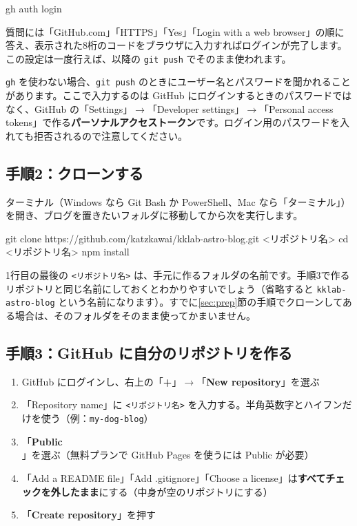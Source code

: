 \documentclass[a4paper,11pt]{ltjsarticle}
\newcommand{\file}[1]{\texttt{#1}}
\begin{document}
\begin{code}
gh auth login
\end{code}

質問には「GitHub.com」「HTTPS」「Yes」「Login with a web browser」の順に答え、表示された8桁のコードをブラウザに入力すればログインが完了します。この設定は一度行えば、以降の \file{git push} でそのまま使われます。

\begin{hint}[パスワードを聞かれたら]
\file{gh} を使わない場合、\file{git push} のときにユーザー名とパスワードを聞かれることがあります。ここで入力するのは GitHub にログインするときのパスワードではなく、GitHub の「Settings」$\to$「Developer settings」$\to$「Personal access tokens」で作る\textbf{パーソナルアクセストークン}です。ログイン用のパスワードを入れても拒否されるので注意してください。
\end{hint}

\subsection{手順2：クローンする}

ターミナル（Windows なら Git Bash か PowerShell、Mac なら「ターミナル」）を開き、ブログを置きたいフォルダに移動してから次を実行します。

\begin{code}
git clone https://github.com/katzkawai/kklab-astro-blog.git <リポジトリ名>
cd <リポジトリ名>
npm install
\end{code}

1行目の最後の \file{<リポジトリ名>} は、手元に作るフォルダの名前です。手順3で作るリポジトリと同じ名前にしておくとわかりやすいでしょう（省略すると \file{kklab-astro-blog} という名前になります）。すでに\ref{sec:prep}節の手順でクローンしてある場合は、そのフォルダをそのまま使ってかまいません。

\subsection{手順3：GitHub に自分のリポジトリを作る}

\begin{enumerate}
  \item GitHub にログインし、右上の「\textbf{+}」$\to$「\textbf{New repository}」を選ぶ
  \item 「Repository name」に \file{<リポジトリ名>} を入力する。半角英数字とハイフンだけを使う（例：\file{my-dog-blog}）
  \item 「\textbf{Public}」を選ぶ（無料プランで GitHub Pages を使うには Public が必要）
  \item 「Add a README file」「Add .gitignore」「Choose a license」は\textbf{すべてチェックを外したまま}にする（中身が空のリポジトリにする）
  \item 「\textbf{Create repository}」を押す
\end{enumerate}
\end{document}
